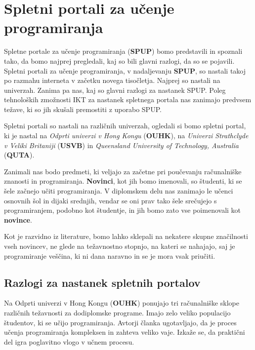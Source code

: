 \section{Spletni portali za učenje programiranja}
\label{sec:SPUP}

Spletne portale za učenje programiranja (\textbf{SPUP}) bomo
predstavili in spoznali tako, da bomo najprej pregledali, kaj so bili
glavni razlogi, da so se pojavili. Spletni portali za učenje
programiranja, v nadaljevanju \textbf{SPUP}, so nastali takoj po
razmahu interneta v začetku novega tisočletja. Najprej so nastali na
univerzah. Zanima pa nas, kaj so glavni razlogi za nastanek SPUP.  Poleg
tehnoloških zmožnosti IKT za nastanek spletnega portala nas zanimajo
predvsem težave, ki so jih skušali premostiti z uporabo SPUP.

Spletni portali so nastali na različnih univerzah, ogledali si bomo
spletni portal, ki je nastal na \emph{Odprti univerzi v Hong
  Kongu} (\textbf{OUHK}), na \emph{Univerzi Strathclyde v Veliki
  Britaniji} (\textbf{USVB}) in \emph{Queensland University of
  Technology, Australia} (\textbf {QUTA}).

Zanimali nas bodo predmeti, ki veljajo za začetne pri poučevanju
računalniške znanosti in programiranja. \textbf{Novinci}, kot jih bomo
imenovali, so študenti, ki se šele začnejo učiti programiranja. V
diplomskem delu nas zanimajo le učenci osnovnih šol in dijaki
srednjih, vendar se oni prav tako šele srečujejo s programiranjem,
podobno kot študentje, in jih bomo zato vse poimenovali kot
\textbf{novince}.

Kot je razvidno iz literature, bomo lahko sklepali na nekatere skupne
značilnosti vseh novincev, ne glede na težavnostno stopnjo, na kateri
se nahajajo, saj je programiranje veščina, ki ni dana naravno in se je
mora vsak priučiti.




\subsection{Razlogi za nastanek spletnih portalov}
\label{sec:razlogi_za_nastanek_SPUP}

Na Odprti univerzi v Hong Kongu (\textbf{OUHK}) ponujajo tri
računalniške sklope različnih težavnosti za dodiplomske
programe. Imajo zelo veliko populacijo študentov, ki se učijo
programiranja. Avtorji članka \cite{ITaLCP_DistanceEdu}
ugotavljajo, da je proces učenja programiranja kompleksen in zahteva
veliko vaje. Izkaže se, da praktični
del igra poglavitno vlogo v učnem procesu.

